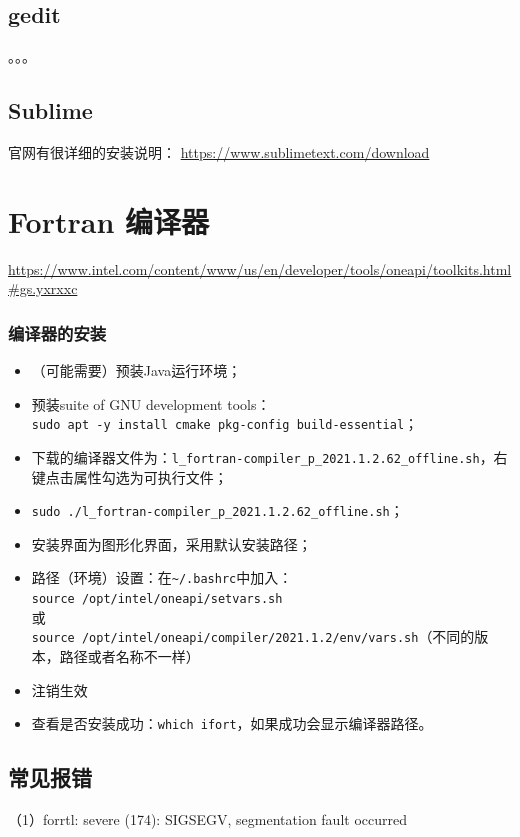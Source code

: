 \subsection{gedit}
。。。


\subsection{Sublime}
官网有很详细的安装说明：
\url{https://www.sublimetext.com/download}










\newpage
\section{Fortran 编译器}
\url{https://www.intel.com/content/www/us/en/developer/tools/oneapi/toolkits.html#gs.yxrxxc}


\subsubsection{编译器的安装}

\begin{itemize}
\item （可能需要）预装Java运行环境；
\item  预装suite of GNU development tools：\\
\verb*|sudo apt -y install cmake pkg-config build-essential|；
\item 下载的编译器文件为：\verb|l_fortran-compiler_p_2021.1.2.62_offline.sh|，右键点击属性勾选为可执行文件；
\item \verb|sudo ./l_fortran-compiler_p_2021.1.2.62_offline.sh|；
\item 安装界面为图形化界面，采用默认安装路径；
\item 路径（环境）设置：在\verb*|~/.bashrc|中加入：\\
\verb|source /opt/intel/oneapi/setvars.sh|\\
或\\
\verb|source /opt/intel/oneapi/compiler/2021.1.2/env/vars.sh|（不同的版本，路径或者名称不一样）
\item 注销生效
\item 查看是否安装成功：\verb|which ifort|，如果成功会显示编译器路径。
\end{itemize}


\subsection{常见报错}
（1）forrtl: severe (174): SIGSEGV, segmentation fault occurred

